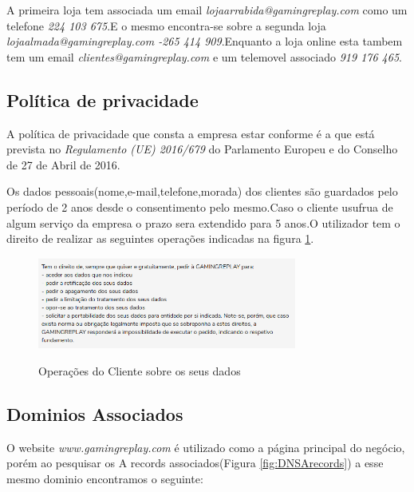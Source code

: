 A primeira loja tem associada um email \emph{lojaarrabida@gamingreplay.com}
como um telefone \emph{224 103 675}.E o mesmo encontra-se sobre a segunda loja \emph{lojaalmada@gamingreplay.com -265 414 909}.Enquanto a loja online esta tambem tem um email \emph{clientes@gamingreplay.com} e um telemovel associado \emph{919 176 465}.

\subsection{Política de privacidade}

A política de privacidade que consta a empresa estar conforme é a que está prevista no \emph{Regulamento (UE) 2016/679} do Parlamento Europeu e do Conselho de 27 de Abril de 2016.

Os dados pessoais(nome,e-mail,telefone,morada) dos clientes são guardados pelo período de 2 anos desde o consentimento pelo mesmo.Caso o cliente usufrua de algum serviço da empresa o prazo sera extendido para 5 anos.O utilizador tem o direito de realizar as seguintes operações indicadas na figura \ref{fig:OperCliente}.

\begin{figure}[h!]
\caption{Operações do Cliente sobre os seus dados}
\centering
\includegraphics[width=\textwidth,height=3cm,keepaspectratio]{Images/OperCliente.png}
\label{fig:OperCliente}
\end{figure}

\subsection{Dominios Associados}

O website \emph{www.gamingreplay.com} é utilizado como a página principal do negócio, porém ao pesquisar os A records associados(Figura \ref{fig:DNSArecords}) a esse mesmo dominio encontramos o seguinte:

